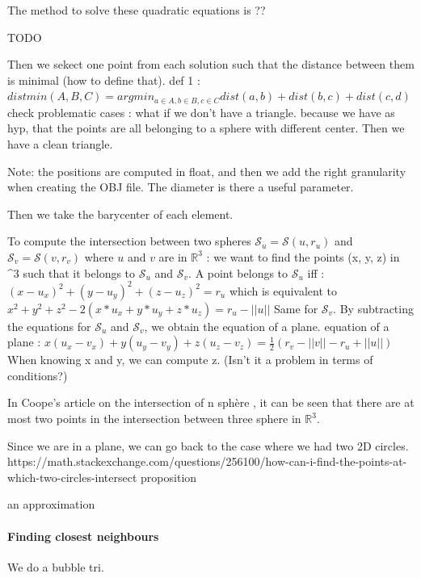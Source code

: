 \documentclass{article}
\begin{document}
The method to solve these quadratic equations is ?? 

TODO

Then we sekect one point from each solution such that the distance between them is minimal (how to define that). 
def 1 : $distmin(A, B, C) = argmin_{a \in A, b \in B, c \in C}  dist(a, b) + dist(b, c) + dist(c, d)$
check problematic cases : what if we don't have a triangle.
because we have as hyp, that the points are all belonging to a sphere with different center. Then we have a clean triangle. 


Note: the positions are computed in float, and then we add the right granularity when creating the OBJ file. The diameter is there a useful parameter. 

Then we take the barycenter of each element. 

To compute the intersection between two spheres $\mathcal{S}_{u} = \mathcal{S}(u, r_{u})$ and $\mathcal{S}_{v} = \mathcal{S}(v, r_{v})$ where $u$ and $v$ are in $\mathbb{R}^3$ :
we want to find the points (x, y, z) in ^{3} such that it belongs to $\mathcal{S}_{u}$ and $\mathcal{S}_{v}$. 
A point belongs to $\mathcal{S}_{u}$ iff : 
$ (x-u_{x})^2 + (y - u_{y})^2 + (z - u_{z})^2 = r_{u}$
which is equivalent to \\
$x^2+ y^2+z^2 - 2 (x * u_{x} + y * u_{y} + z * u_{z}) = r_{u} - ||u||$
Same for $\mathcal{S}_v$.  
By subtracting the equations for $\mathcal{S}_u$ and $\mathcal{S}_v$, we obtain the equation of a plane. 
equation of a plane : 
$x(u_{x} - v_{x}) + y (u_{y} - v_{y}) + z (u_{z} - v_{z}) = \frac{1}{2} (r_{v} - ||v|| - r_{u} + ||u||)$
When knowing x and y, we can compute z. (Isn't it a problem in terms of conditions?)

In Coope's article on the intersection of n sphère \cite{nsphere}, it can be seen that there are at most two points in the intersection between three sphere in $\mathbb{R}^3$. 

Since we are in a plane, we can go back to the case where we had two 2D circles.  
https://math.stackexchange.com/questions/256100/how-can-i-find-the-points-at-which-two-circles-intersect proposition

an approximation


\paragraph{Finding closest neighbours}
We do a bubble tri. 
\end{document}
